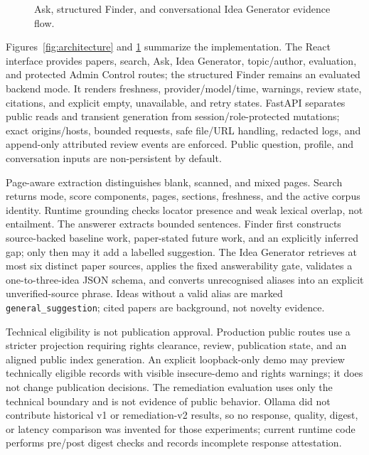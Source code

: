 \documentclass[conference,letterpaper]{IEEEtran}
\begin{document}
\begin{figure}[t]
\centering
\resizebox{0.96\textwidth}{!}{}
\caption{Ask, structured Finder, and conversational Idea Generator evidence flow.}
\label{fig:workflow}
\end{figure}

Figures~\ref{fig:architecture} and \ref{fig:workflow} summarize the implementation. The React interface provides papers, search, Ask, Idea Generator, topic/author, evaluation, and protected Admin Control routes; the structured Finder remains an evaluated backend mode. It renders freshness, provider/model/time, warnings, review state, citations, and explicit empty, unavailable, and retry states. FastAPI separates public reads and transient generation from session/role-protected mutations; exact origins/hosts, bounded requests, safe file/URL handling, redacted logs, and append-only attributed review events are enforced. Public question, profile, and conversation inputs are non-persistent by default.

Page-aware extraction distinguishes blank, scanned, and mixed pages. Search returns mode, score components, pages, sections, freshness, and the active corpus identity. Runtime grounding checks locator presence and weak lexical overlap, not entailment. The answerer extracts bounded sentences. Finder first constructs source-backed baseline work, paper-stated future work, and an explicitly inferred gap; only then may it add a labelled suggestion. The Idea Generator retrieves at most six distinct paper sources, applies the fixed answerability gate, validates a one-to-three-idea JSON schema, and converts unrecognised aliases into an explicit unverified-source phrase. Ideas without a valid alias are marked \texttt{general\_suggestion}; cited papers are background, not novelty evidence.

Technical eligibility is not publication approval. Production public routes use a stricter projection requiring rights clearance, review, publication state, and an aligned public index generation. An explicit loopback-only demo may preview technically eligible records with visible insecure-demo and rights warnings; it does not change publication decisions. The remediation evaluation uses only the technical boundary and is not evidence of public behavior. Ollama did not contribute historical v1 or remediation-v2 results, so no response, quality, digest, or latency comparison was invented for those experiments; current runtime code performs pre/post digest checks and records incomplete response attestation.
\end{document}
